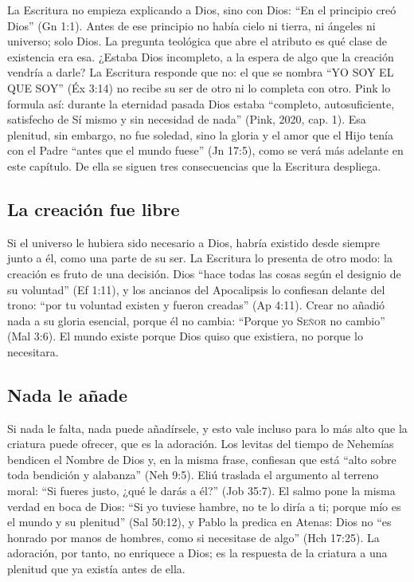 \documentclass[11pt,letterpaper]{article}
\newcommand{\SENOR}{\textsc{Señor}}
\begin{document}
La Escritura no empieza explicando a Dios, sino con Dios: ``En el principio creó Dios'' (Gn 1:1). Antes de ese principio no había cielo ni tierra, ni ángeles ni universo; solo Dios. La pregunta teológica que abre el atributo es qué clase de existencia era esa. ¿Estaba Dios incompleto, a la espera de algo que la creación vendría a darle? La Escritura responde que no: el que se nombra ``YO SOY EL QUE SOY'' (Éx 3:14) no recibe su ser de otro ni lo completa con otro. Pink lo formula así: durante la eternidad pasada Dios estaba ``completo, autosuficiente, satisfecho de Sí mismo y sin necesidad de nada'' (Pink, 2020, cap. 1). Esa plenitud, sin embargo, no fue soledad, sino la gloria y el amor que el Hijo tenía con el Padre ``antes que el mundo fuese'' (Jn 17:5), como se verá más adelante en este capítulo. De ella se siguen tres consecuencias que la Escritura despliega.

\subsection{La creación fue libre}

Si el universo le hubiera sido necesario a Dios, habría existido desde siempre junto a él, como una parte de su ser. La Escritura lo presenta de otro modo: la creación es fruto de una decisión. Dios ``hace todas las cosas según el designio de su voluntad'' (Ef 1:11), y los ancianos del Apocalipsis lo confiesan delante del trono: ``por tu voluntad existen y fueron creadas'' (Ap 4:11). Crear no añadió nada a su gloria esencial, porque él no cambia: ``Porque yo \SENOR{} no cambio'' (Mal 3:6). El mundo existe porque Dios quiso que existiera, no porque lo necesitara.

\subsection{Nada le añade}

Si nada le falta, nada puede añadírsele, y esto vale incluso para lo más alto que la criatura puede ofrecer, que es la adoración. Los levitas del tiempo de Nehemías bendicen el Nombre de Dios y, en la misma frase, confiesan que está ``alto sobre toda bendición y alabanza'' (Neh 9:5). Eliú traslada el argumento al terreno moral: ``Si fueres justo, ¿qué le darás a él?'' (Job 35:7). El salmo pone la misma verdad en boca de Dios: ``Si yo tuviese hambre, no te lo diría a ti; porque mío es el mundo y su plenitud'' (Sal 50:12), y Pablo la predica en Atenas: Dios no ``es honrado por manos de hombres, como si necesitase de algo'' (Hch 17:25). La adoración, por tanto, no enriquece a Dios; es la respuesta de la criatura a una plenitud que ya existía antes de ella.
\end{document}
